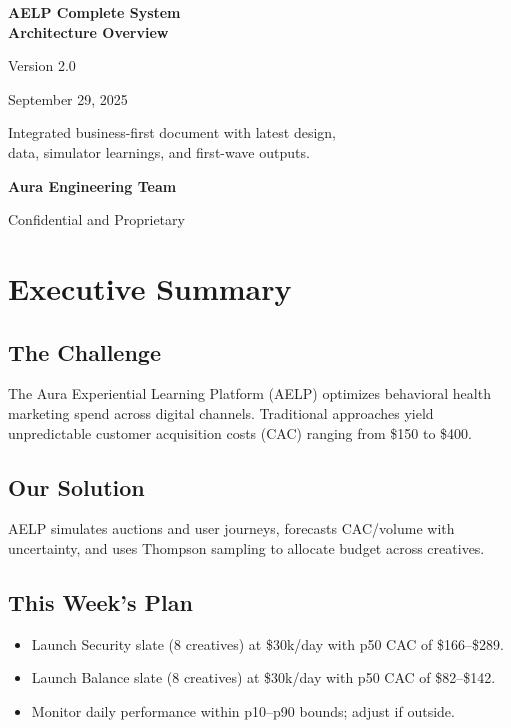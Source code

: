 \documentclass[11pt,a4paper]{report}
\begin{document}
\begin{titlepage}
    \centering
    \vspace*{2cm}
    {\Huge\bfseries\color{aelpblue} AELP Complete System\\Architecture Overview\par}
    \vspace{1cm}
    {\Large Version 2.0\par}
    \vspace{0.5cm}
    {\large September 29, 2025\par}
    \vspace{2cm}
    \begin{tcolorbox}[colback=aelplightgray,colframe=aelpblue,width=0.8\textwidth]
        \centering
        Integrated business-first document with latest design,\\
        data, simulator learnings, and first-wave outputs.
    \end{tcolorbox}
    \vfill
    {\large\textbf{Aura Engineering Team}\par}
    \vspace{1cm}
    {\small Confidential and Proprietary\par}
\end{titlepage}

\tableofcontents
\newpage

\chapter{Executive Summary}
\section{The Challenge}
The Aura Experiential Learning Platform (AELP) optimizes behavioral health marketing spend across digital channels. Traditional approaches yield unpredictable customer acquisition costs (CAC) ranging from \$150 to \$400.

\section{Our Solution}
AELP simulates auctions and user journeys, forecasts CAC/volume with uncertainty, and uses Thompson sampling to allocate budget across creatives.

\section{This Week's Plan}
\begin{itemize}[itemsep=0.5em]
  \item Launch Security slate (8 creatives) at \$30k/day with p50 CAC of \$166--\$289.
  \item Launch Balance slate (8 creatives) at \$30k/day with p50 CAC of \$82--\$142.
  \item Monitor daily performance within p10--p90 bounds; adjust if outside.
\end{itemize}
\end{document}
